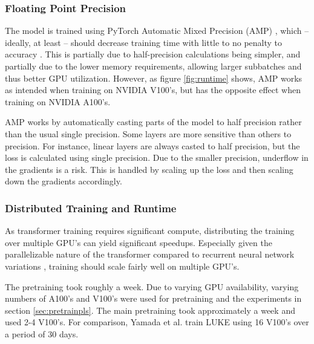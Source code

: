 \documentclass[main.tex]{subfiles}
\begin{document}
\subsubsection{Floating Point Precision}
The model is trained using PyTorch Automatic Mixed Precision (AMP) \cite{pytorchamp}, which -- ideally, at least -- should decrease training time with little to no penalty to accuracy \cite{huang2020amp}.
This is partially due to half-precision calculations being simpler, and partially due to the lower memory requirements, allowing larger subbatches and thus better GPU utilization.
However, as figure \ref{fig:runtime} shows, AMP works as intended when training on NVIDIA V100's, but has the opposite effect when training on NVIDIA A100's.

AMP works by automatically casting parts of the model to half precision rather than the usual single precision.
Some layers are more sensitive than others to precision.
For instance, linear layers are always casted to half precision, but the loss is calculated using single precision.
Due to the smaller precision, underflow in the gradients is a risk.
This is handled by scaling up the loss and then scaling down the gradients accordingly.
\cite{pytorchamp}

\subsubsection{Distributed Training and Runtime}
As transformer training requires significant compute, distributing the training over multiple GPU's can yield significant speedups.
Especially given the parallelizable nature of the transformer compared to recurrent neural network variations \cite{vaswani2017att}, training should scale fairly well on multiple GPU's.

The pretraining took roughly a week.
Due to varying GPU availability, varying numbers of A100's and V100's were used for pretraining and the experiments in section \ref{sec:pretrainpls}.
The main pretraining took approximately a week and used 2-4 V100's.
For comparison, Yamada et al. train LUKE using 16 V100's over a period of 30 days. \cite{yamada2020luke}
\end{document}
